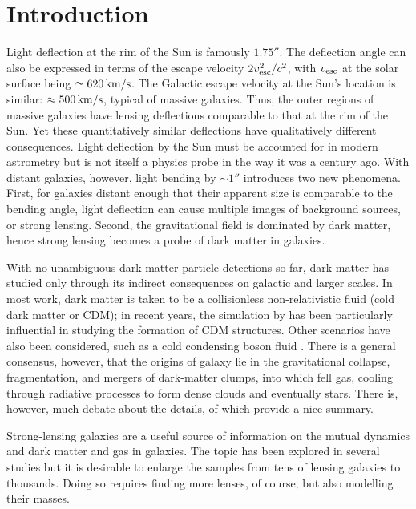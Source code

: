 \section{Introduction}

Light deflection at the rim of the Sun is famously $1.75''$.  The
deflection angle can also be expressed in terms of the escape velocity
$2v_{\rm esc}^2/c^2$, with $v_{\rm esc}$ at the solar surface being
$\simeq620\rm\,km/s$.  The Galactic escape velocity at the Sun's
location is similar: $\approx500\rm\,km/s$, typical of massive
galaxies.  Thus, the outer regions of massive galaxies have lensing
deflections comparable to that at the rim of the Sun.  Yet these
quantitatively similar deflections have qualitatively different
consequences.  Light deflection by the Sun must be accounted for in
modern astrometry \citep[see e.g.,][]{2015CQGra..32p5008C} but is not
itself a physics probe in the way it was a century ago.  With distant
galaxies, however, light bending by $\sim1''$ introduces two new
phenomena.  First, for galaxies distant enough that their apparent
size is comparable to the bending angle, light deflection can cause
multiple images of background sources, or strong lensing.  Second, the
gravitational field is dominated by dark matter, hence strong lensing
becomes a probe of dark matter in galaxies.

With no unambiguous dark-matter particle detections so far, dark
matter has studied only through its indirect consequences on galactic
and larger scales.  In most work, dark matter is taken to be a
collisionless non-relativistic fluid (cold dark matter or CDM); in
recent years, the simulation by \cite{2005Natur.435..629S} has been
particularly influential in studying the formation of CDM structures.
Other scenarios have also been considered, such as a cold condensing
boson fluid \citep{2016ApJ...818...89S}.  There is a general
consensus, however, that the origins of galaxy lie in the
gravitational collapse, fragmentation, and mergers of dark-matter
clumps, into which fell gas, cooling through radiative processes to
form dense clouds and eventually stars.  There is, however, much
debate about the details, of which \cite{2012RAA....12..917S} provide
a nice summary.

Strong-lensing galaxies are a useful source of information on the
mutual dynamics and dark matter and gas in galaxies.  The topic has
been explored in several studies
\citep{2009ApJ...703L..51K,2011ApJ...740...97L,2012MNRAS.424..104L,
  2016MNRAS.459.3677L,2016MNRAS.456..870B} but it is desirable to
enlarge the samples from tens of lensing galaxies to thousands.  Doing
so requires finding more lenses, of course, but also modelling their
masses.

